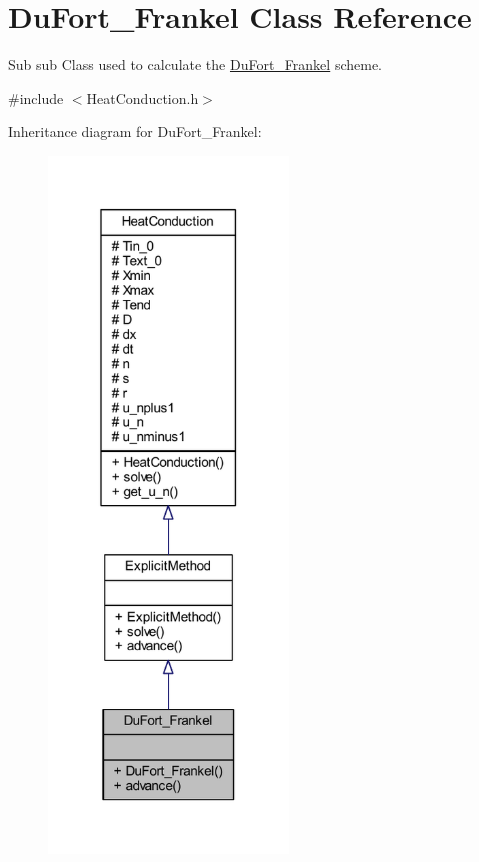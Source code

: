 \hypertarget{class_du_fort___frankel}{}\section{Du\+Fort\+\_\+\+Frankel Class Reference}
\label{class_du_fort___frankel}


Sub sub Class used to calculate the \hyperlink{class_du_fort___frankel}{Du\+Fort\+\_\+\+Frankel} scheme.  




{\ttfamily \#include $<$Heat\+Conduction.\+h$>$}



Inheritance diagram for Du\+Fort\+\_\+\+Frankel\+:
\nopagebreak
\begin{figure}[H]
\begin{center}
\leavevmode
\includegraphics[width=181pt]{class_du_fort___frankel__inherit__graph}
\end{center}
\end{figure}


